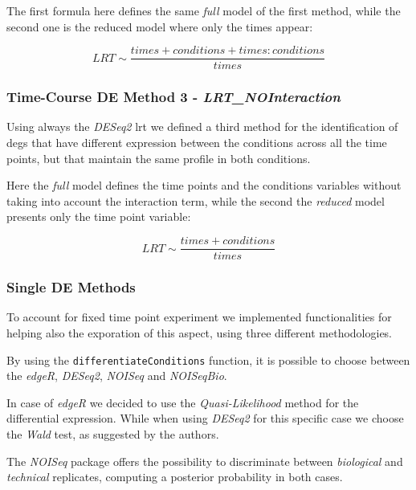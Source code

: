The first formula here defines the same \textit{full} model of the first method, while the second one is the reduced model where only the times appear:

\[LRT \sim \frac{times+conditions+times:conditions}{times}\]


\subsubsection{Time-Course DE Method 3 - \textit{LRT\_NOInteraction}}
Using always the \textit{DESeq2} \gls{lrt} we defined a third method for the 
identification of \glspl{deg} that have different expression between the conditions across all the time points, but that maintain the same profile in both conditions.

Here the \textit{full} model defines the time points and the conditions variables without taking into account the interaction term, while the second the \textit{reduced} model presents only the time point variable:

\[LRT \sim \frac{times+conditions}{times}\]


%


\subsubsection{Single DE Methods}

To account for fixed time point experiment we implemented functionalities for helping also the exporation of this aspect, using three different methodologies.
 

By using the \lstinline!differentiateConditions! function, it is possible to choose between the \textit{edgeR}, \textit{DESeq2}, \textit{NOISeq} and \textit{NOISeqBio}.

In case of \textit{edgeR} we decided to use the \textit{Quasi-Likelihood} method for the differential expression.
While when using \textit{DESeq2} for this specific case we choose the \textit{Wald} test, as suggested by the authors.

The \textit{NOISeq} package offers the possibility to discriminate between \textit{biological} and \textit{technical} replicates, computing a posterior probability in both cases. 




